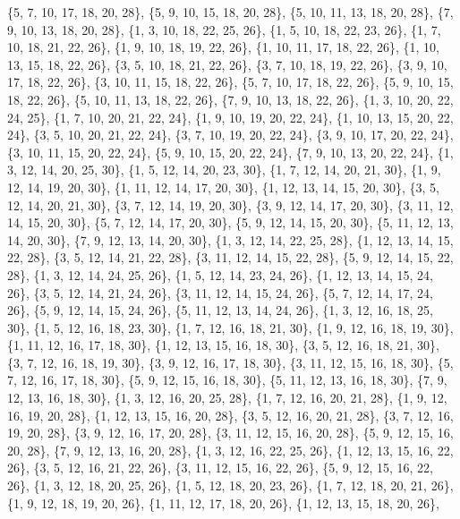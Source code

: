 \documentclass[11pt,a4paper]{article}
\begin{document}
{\{5, 7, 10, 17, 18, 20, 28\}, \{5, 9, 10, 15, 18, 20, 28\}, \{5, 10, 11, 13, 18, 20, 28\}, \{7, 9, 10, 13, 18, 20, 28\}, \{1, 3, 10, 18, 22, 25, 26\},
\{1, 5, 10, 18, 22, 23, 26\}, \{1, 7, 10, 18, 21, 22, 26\}, \{1, 9, 10, 18, 19, 22, 26\}, \{1, 10, 11, 17, 18, 22, 26\}, \{1, 10, 13, 15, 18, 22, 26\},
\{3, 5, 10, 18, 21, 22, 26\}, \{3, 7, 10, 18, 19, 22, 26\}, \{3, 9, 10, 17, 18, 22, 26\}, \{3, 10, 11, 15, 18, 22, 26\}, \{5, 7, 10, 17, 18, 22, 26\},
\{5, 9, 10, 15, 18, 22, 26\}, \{5, 10, 11, 13, 18, 22, 26\}, \{7, 9, 10, 13, 18, 22, 26\}, \{1, 3, 10, 20, 22, 24, 25\}, \{1, 7, 10, 20, 21, 22, 24\},
\{1, 9, 10, 19, 20, 22, 24\}, \{1, 10, 13, 15, 20, 22, 24\}, \{3, 5, 10, 20, 21, 22, 24\}, \{3, 7, 10, 19, 20, 22, 24\}, \{3, 9, 10, 17, 20, 22, 24\},
\{3, 10, 11, 15, 20, 22, 24\}, \{5, 9, 10, 15, 20, 22, 24\}, \{7, 9, 10, 13, 20, 22, 24\}, \{1, 3, 12, 14, 20, 25, 30\}, \{1, 5, 12, 14, 20, 23, 30\},
\{1, 7, 12, 14, 20, 21, 30\}, \{1, 9, 12, 14, 19, 20, 30\}, \{1, 11, 12, 14, 17, 20, 30\}, \{1, 12, 13, 14, 15, 20, 30\}, \{3, 5, 12, 14, 20, 21, 30\},
\{3, 7, 12, 14, 19, 20, 30\}, \{3, 9, 12, 14, 17, 20, 30\}, \{3, 11, 12, 14, 15, 20, 30\}, \{5, 7, 12, 14, 17, 20, 30\}, \{5, 9, 12, 14, 15, 20, 30\},
\{5, 11, 12, 13, 14, 20, 30\}, \{7, 9, 12, 13, 14, 20, 30\}, \{1, 3, 12, 14, 22, 25, 28\}, \{1, 12, 13, 14, 15, 22, 28\}, \{3, 5, 12, 14, 21, 22, 28\},
\{3, 11, 12, 14, 15, 22, 28\}, \{5, 9, 12, 14, 15, 22, 28\}, \{1, 3, 12, 14, 24, 25, 26\}, \{1, 5, 12, 14, 23, 24, 26\}, \{1, 12, 13, 14, 15, 24, 26\},
\{3, 5, 12, 14, 21, 24, 26\}, \{3, 11, 12, 14, 15, 24, 26\}, \{5, 7, 12, 14, 17, 24, 26\}, \{5, 9, 12, 14, 15, 24, 26\}, \{5, 11, 12, 13, 14, 24, 26\},
\{1, 3, 12, 16, 18, 25, 30\}, \{1, 5, 12, 16, 18, 23, 30\}, \{1, 7, 12, 16, 18, 21, 30\}, \{1, 9, 12, 16, 18, 19, 30\}, \{1, 11, 12, 16, 17, 18, 30\},
\{1, 12, 13, 15, 16, 18, 30\}, \{3, 5, 12, 16, 18, 21, 30\}, \{3, 7, 12, 16, 18, 19, 30\}, \{3, 9, 12, 16, 17, 18, 30\}, \{3, 11, 12, 15, 16, 18, 30\},
\{5, 7, 12, 16, 17, 18, 30\}, \{5, 9, 12, 15, 16, 18, 30\}, \{5, 11, 12, 13, 16, 18, 30\}, \{7, 9, 12, 13, 16, 18, 30\}, \{1, 3, 12, 16, 20, 25, 28\},
\{1, 7, 12, 16, 20, 21, 28\}, \{1, 9, 12, 16, 19, 20, 28\}, \{1, 12, 13, 15, 16, 20, 28\}, \{3, 5, 12, 16, 20, 21, 28\}, \{3, 7, 12, 16, 19, 20, 28\},
\{3, 9, 12, 16, 17, 20, 28\}, \{3, 11, 12, 15, 16, 20, 28\}, \{5, 9, 12, 15, 16, 20, 28\}, \{7, 9, 12, 13, 16, 20, 28\}, \{1, 3, 12, 16, 22, 25, 26\},
\{1, 12, 13, 15, 16, 22, 26\}, \{3, 5, 12, 16, 21, 22, 26\}, \{3, 11, 12, 15, 16, 22, 26\}, \{5, 9, 12, 15, 16, 22, 26\}, \{1, 3, 12, 18, 20, 25, 26\},
\{1, 5, 12, 18, 20, 23, 26\}, \{1, 7, 12, 18, 20, 21, 26\}, \{1, 9, 12, 18, 19, 20, 26\}, \{1, 11, 12, 17, 18, 20, 26\}, \{1, 12, 13, 15, 18, 20, 26\},
}
\end{document}
